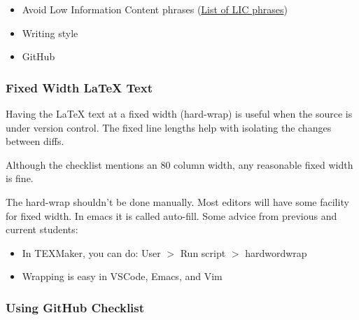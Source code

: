 \documentclass[12pt]{article}
\begin{document}
\begin{itemize}
\item Avoid Low Information Content phrases 
    (\href{https://www.webpages.uidaho.edu/range357/extra-refs/empty-words.htm}{List
      of LIC phrases})


\item Writing style
  
\item GitHub

\end{itemize}

\subsubsection*{Fixed Width \LaTeX{} Text}

Having the \LaTeX{} text at a fixed width (hard-wrap) is useful when the source
is under version control.  The fixed line lengths help with isolating the
changes between diffs.

Although the checklist mentions an 80 column width, any reasonable fixed width
is fine.

The hard-wrap shouldn't be done manually.  Most editors will have some facility
for fixed width.  In emacs it is called auto-fill.  Some advice from previous
and current students:

\begin{itemize}
\item In TEXMaker, you can do: User $>$ Run script $>$ hardwordwrap
\item Wrapping is easy in VSCode, Emacs, and Vim
\end{itemize}

\subsubsection*{Using GitHub Checklist}
\end{document}
